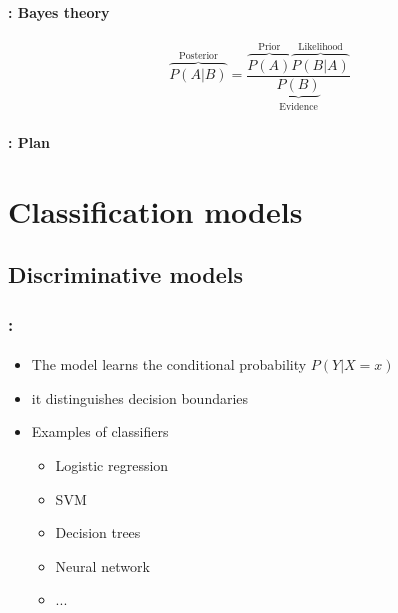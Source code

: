 \documentclass[xcolor=table]{beamer}
\subtitle[Naive Bayes]{Naive Bayes}
\begin{document}
\begin{frame}
	\frametitle{\inserttitle}
	\framesubtitle{\insertshortsubtitle: Bayes theory}
	\huge
	\[
	\overbrace{P(A|B)}^\text{Posterior} = \frac{\overbrace{P(A)}^\text{Prior} \overbrace{P(B|A)}^{\text{Likelihood}}}{\underbrace{P(B)}_\text{Evidence}}
	\]
\end{frame}

\begin{frame}
	\frametitle{\inserttitle}
	\framesubtitle{\insertshortsubtitle: Plan}

	\begin{multicols}{2}
		\tableofcontents
	\end{multicols}
\end{frame}

\section{Classification models}

\begin{frame}
	\frametitle{\insertshortsubtitle}
	\framesubtitle{\insertsection}
	
	
	
\end{frame}

\subsection{Discriminative models}

\begin{frame}
	\frametitle{\insertshortsubtitle: \insertsection}
	\framesubtitle{\insertsubsection}
	
	\begin{itemize}
		\item The model learns the conditional probability $P(Y|X=x)$
		\item it distinguishes decision boundaries 
		\item Examples of classifiers
		\begin{itemize}
			\item Logistic regression
			\item SVM
			\item Decision trees
			\item Neural network
			\item...
		\end{itemize}
	\end{itemize}
	
\end{frame}
\end{document}
